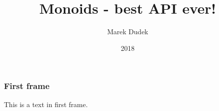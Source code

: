 \documentclass{beamer}
\title{Monoids - best API ever!}
\author{Marek Dudek}
\institute{ShareLaTeX}
\date{2018}
\begin{document}
\frame{\titlepage}

    \begin{frame}

    \frametitle{First frame}

    This is a text in first frame.
        
    \end{frame}
\end{document}
